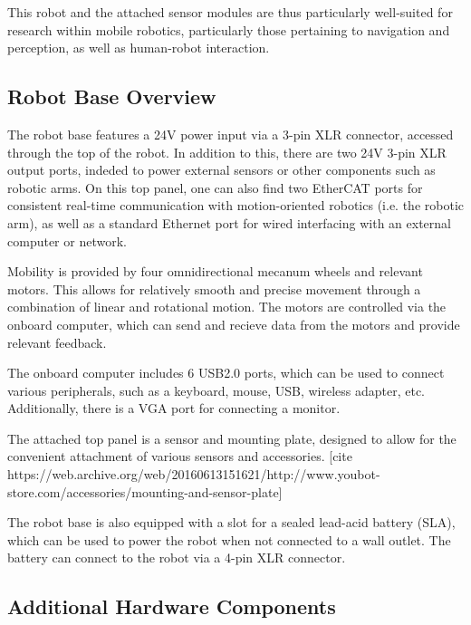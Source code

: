 \documentclass[a4paper, 12pt]{article}
\newif\ifshownotes
\newcommand{\notes}[1]{\ifshownotes\textcolor{blue}{#1}\fi}
\begin{document}
    This robot and the attached sensor modules are thus particularly well-suited for research within mobile robotics, particularly those pertaining to navigation and perception, as well as human-robot interaction. 

    \subsection{Robot Base Overview}

    \notes{initial inspection\\}


    The robot base features a 24V power input via a 3-pin XLR connector, accessed through the top of the robot. In addition to this, there are two 24V 3-pin XLR output ports, indeded to power external sensors or other components such as robotic arms. On this top panel, one can also find two EtherCAT ports for consistent real-time communication with motion-oriented robotics (i.e. the robotic arm), as well as a standard Ethernet port for wired interfacing with an external computer or network. 

    Mobility is provided by four omnidirectional mecanum wheels and relevant motors. This allows for relatively smooth and precise movement through a combination of linear and rotational motion. The motors are controlled via the onboard computer, which can send and recieve data from the motors and provide relevant feedback.

    The onboard computer includes 6 USB2.0 ports, which can be used to connect various peripherals, such as a keyboard, mouse, USB, wireless adapter, etc. Additionally, there is a VGA port for connecting a monitor. \cite{githubYoubotOverview}  

    The attached top panel is a sensor and mounting plate, designed to allow for the convenient attachment of various sensors and accessories. [cite https://web.archive.org/web/20160613151621/http://www.youbot-store.com/accessories/mounting-and-sensor-plate]

    The robot base is also equipped with a slot for a sealed lead-acid battery (SLA), which can be used to power the robot when not connected to a wall outlet. The battery can connect to the robot via a 4-pin XLR connector.  

    \subsection{Additional Hardware Components}
\end{document}
